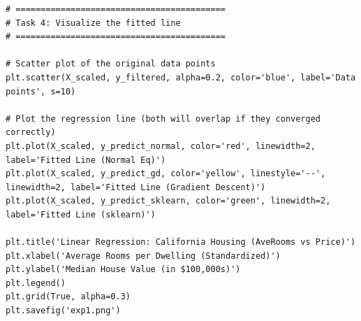 \documentclass[11pt,a4paper]{article}
\begin{document}
\begin{lstlisting}
# ==========================================
# Task 4: Visualize the fitted line
# ==========================================

# Scatter plot of the original data points
plt.scatter(X_scaled, y_filtered, alpha=0.2, color='blue', label='Data points', s=10)

# Plot the regression line (both will overlap if they converged correctly)
plt.plot(X_scaled, y_predict_normal, color='red', linewidth=2, label='Fitted Line (Normal Eq)')
plt.plot(X_scaled, y_predict_gd, color='yellow', linestyle='--', linewidth=2, label='Fitted Line (Gradient Descent)')
plt.plot(X_scaled, y_predict_sklearn, color='green', linewidth=2, label='Fitted Line (sklearn)')

plt.title('Linear Regression: California Housing (AveRooms vs Price)')
plt.xlabel('Average Rooms per Dwelling (Standardized)')
plt.ylabel('Median House Value (in $100,000s)')
plt.legend()
plt.grid(True, alpha=0.3)
plt.savefig('exp1.png')
\end{lstlisting}

\newpage
\end{document}
